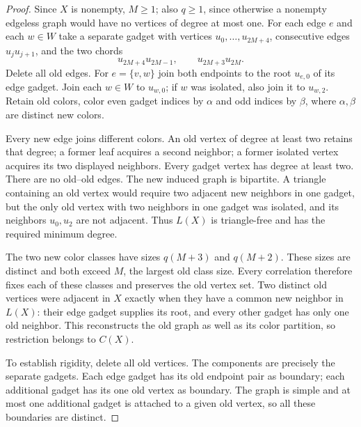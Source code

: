 \begin{proof}
Since $X$ is nonempty, $M\geq1$; also $q\geq1$, since otherwise a nonempty
edgeless graph would have no vertices of degree at most one.
For each edge $e$ and each $w\in W$ take a separate gadget with vertices
$u_0,\ldots,u_{2M+4}$, consecutive edges $u_ju_{j+1}$, and the two chords
\begin{equation}\label{eq:tail}
 u_{2M+4}u_{2M-1},\qquad u_{2M+3}u_{2M}.
\end{equation}
Delete all old edges. For $e=\{v,w\}$ join both endpoints to the root
$u_{e,0}$ of its edge gadget. Join each $w\in W$ to $u_{w,0}$; if $w$ was
isolated, also join it to $u_{w,2}$. Retain old colors, color even gadget
indices by $\alpha$ and odd indices by $\beta$, where $\alpha,\beta$ are
distinct new colors.

Every new edge joins different colors. An old vertex of degree at least two
retains that degree; a former leaf acquires a second neighbor; a former
isolated vertex acquires its two displayed neighbors. Every gadget vertex has
degree at least two. There are no old--old edges. The new induced graph is
bipartite. A triangle containing an old vertex would require two adjacent new
neighbors in one gadget, but the only old vertex with two neighbors in one
gadget was isolated, and its neighbors $u_0,u_2$ are not adjacent. Thus $L(X)$
is triangle-free and has the required minimum degree.

The two new color classes have sizes $q(M+3)$ and $q(M+2)$. These sizes are
distinct and both exceed $M$, the largest old class size. Every correlation
therefore fixes each of these classes and preserves the old vertex set. Two
distinct old vertices were adjacent in $X$ exactly when they have a common
new neighbor in $L(X)$: their edge gadget supplies its root, and every other
gadget has only one old neighbor. This reconstructs the old graph as well as
its color partition, so restriction belongs to $C(X)$.

To establish rigidity, delete all old vertices. The components are precisely
the separate gadgets. Each edge gadget has its old endpoint pair as boundary;
each additional gadget has its one old vertex as boundary. The graph is simple
and at most one additional gadget is attached to a given old vertex, so all
these boundaries are distinct.


\end{proof}
